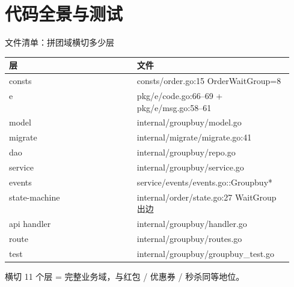 \documentclass[aspectratio=169,11pt]{beamer}
\begin{document}
\section{代码全景与测试}

\begin{frame}[shrink]{文件清单：拼团域横切多少层}
\begin{center}
\footnotesize
\begin{tabular}{@{}lp{0.55\linewidth}@{}}
\toprule
层 & 文件 \\
\midrule
consts        & consts/order.go:15 OrderWaitGroup=8 \\
e             & pkg/e/code.go:66--69 + pkg/e/msg.go:58--61 \\
model         & internal/groupbuy/model.go \\
migrate       & internal/migrate/migrate.go:41 \\
dao           & internal/groupbuy/repo.go \\
service       & internal/groupbuy/service.go \\
events        & service/events/events.go::Groupbuy* \\
state-machine & internal/order/state.go:27 WaitGroup 出边 \\
api handler   & internal/groupbuy/handler.go \\
route         & internal/groupbuy/routes.go \\
test          & internal/groupbuy/groupbuy\_test.go \\
\bottomrule
\end{tabular}
\end{center}
\vspace{1mm}

{\footnotesize 横切 11 个层 = 完整业务域，与红包 / 优惠券 / 秒杀同等地位。}
\end{frame}
\end{document}

